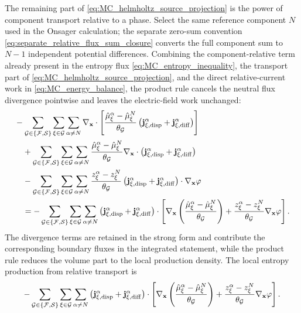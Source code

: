The remaining part of
\eqref{eq:MC_helmholtz_source_projection} is the power of component transport
relative to a phase.  Select the same reference component \(N\) used in the
Onsager calculation; the separate zero-sum convention
\eqref{eq:separate_relative_flux_sum_closure} converts the full component sum
to \(N-1\) independent potential differences.  Combining the component-relative
term already present in the entropy flux \eqref{eq:MC_entropy_inequality}, the
transport part of \eqref{eq:MC_helmholtz_source_projection}, and the direct
relative-current work in \eqref{eq:MC_energy_balance}, the product rule cancels
the neutral flux divergence pointwise and leaves the electric-field work
unchanged:
%
\begin{equation}
	\begin{aligned}
		 & -
		\sum_{\mathcal{G}\in\{\mathcal{F},\mathcal{S}\}}
		\sum_{\xi\in\mathcal{G}}\sum_{\alpha\ne N}
		\nabla_{\mathbf{x}}\cdot
		\left[
			\frac{\hat\mu_\xi^\alpha-\hat\mu_\xi^N}{\theta_{\mathcal{G}}}
			\left(
			\mathbf{j}_{\xi,{\rm disp}}^\alpha
			+
			\mathbf{j}_{\xi,{\rm diff}}^\alpha
			\right)
		\right]
		\\
		 & \quad +
		\sum_{\mathcal{G}\in\{\mathcal{F},\mathcal{S}\}}
		\sum_{\xi\in\mathcal{G}}\sum_{\alpha\ne N}
		\frac{\hat\mu_\xi^\alpha-\hat\mu_\xi^N}{\theta_{\mathcal{G}}}
		\nabla_{\mathbf{x}}\cdot
		\left(
		\mathbf{j}_{\xi,{\rm disp}}^\alpha
		+
		\mathbf{j}_{\xi,{\rm diff}}^\alpha
		\right)
		\\
		 & \quad -
		\sum_{\mathcal{G}\in\{\mathcal{F},\mathcal{S}\}}
		\sum_{\xi\in\mathcal{G}}\sum_{\alpha\ne N}
		\frac{
			z_\xi^\alpha-z_\xi^N
		}{\theta_{\mathcal{G}}}
		\left(
				\mathbf{j}_{\xi,{\rm disp}}^\alpha
				+
				\mathbf{j}_{\xi,{\rm diff}}^\alpha
		\right)\cdot
		\nabla_{\mathbf{x}}\varphi
		\\
		 & \quad =
		-
		\sum_{\mathcal{G}\in\{\mathcal{F},\mathcal{S}\}}
		\sum_{\xi\in\mathcal{G}}\sum_{\alpha\ne N}
		\left(
		\mathbf{j}_{\xi,{\rm disp}}^\alpha
		+
		\mathbf{j}_{\xi,{\rm diff}}^\alpha
		\right)\cdot
		\left[
			\nabla_{\mathbf{x}}
			\left(
				\frac{
					\hat\mu_\xi^\alpha-\hat\mu_\xi^N
				}{\theta_{\mathcal{G}}}
			\right)
			+
			\frac{
				z_\xi^\alpha-z_\xi^N
			}{\theta_{\mathcal{G}}}
			\nabla_{\mathbf{x}}\varphi
		\right].
	\end{aligned}
	\label{eq:relative_transport_product_rule}
\end{equation}
%
The divergence terms are retained in the strong form and contribute the
corresponding boundary fluxes in the integrated statement, while the product
rule reduces the volume part to the local production density.  The local
entropy production from relative transport is
%
\begin{equation}
	-\sum_{\mathcal{G}\in\{\mathcal{F},\mathcal{S}\}}
	\sum_{\xi\in\mathcal{G}}\sum_{\alpha\ne N}
	\left(
	\mathbf{j}_{\xi,{\rm disp}}^\alpha
	+
		\mathbf{j}_{\xi,{\rm diff}}^\alpha
		\right)\cdot
	\left[
		\nabla_{\mathbf{x}}
		\left(
			\frac{
				\hat\mu_\xi^\alpha-\hat\mu_\xi^N
			}{\theta_{\mathcal{G}}}
		\right)
		+
		\frac{
			z_\xi^\alpha-z_\xi^N
		}{\theta_{\mathcal{G}}}
		\nabla_{\mathbf{x}}\varphi
	\right].
	\label{eq:MC_relative_transport_power}
\end{equation}
